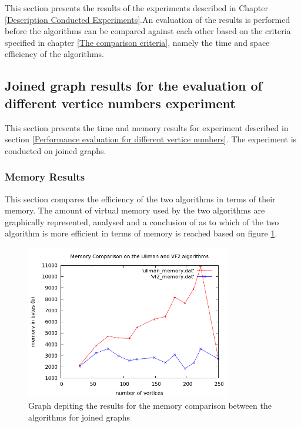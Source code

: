 \label{Experiment Results}
This section presents the results of the experiments described in Chapter \ref{Description Conducted Experiments}.An evaluation of the results is
performed before the algorithms can be compared against each other based on the criteria specified in chapter \ref{The comparison criteria}, namely the time and 
space efficiency of the algorithms.

\subsection{Joined graph results for the evaluation of different vertice numbers experiment}
This section presents the time and memory results for experiment described in section \ref{Performance evaluation for different vertice numbers}. The 
experiment is conducted on joined graphs.
\subsubsection{Memory Results}
\label{Memory Results}
This section compares the efficiency of the two algorithms in terms of their memory. The amount of virtual memory used by the two algorithms are graphically 
represented, analysed and a conclusion of as to which of the two algorithm is more efficient in terms of memory is reached based on figure \ref{fig:memory_comparison}.
\begin{figure}[H]
  \begin{center}
      \includegraphics[width=0.8\textwidth]{memory_comparison.png}
  \end{center}    
  \caption{Graph depiting the results for the memory comparison between the algorithms for joined graphs}
  \label{fig:memory_comparison}
\end{figure}


